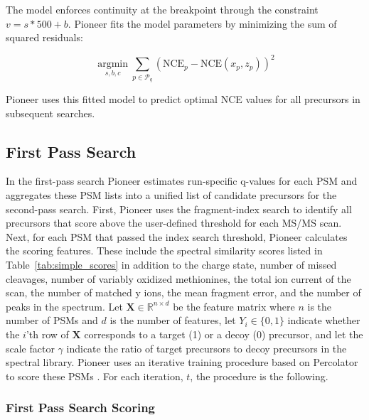 \documentclass[pdflatex,sn-nature]{sn-jnl}
\begin{document}
The model enforces continuity at the breakpoint through the constraint $v = s*500 + b$. Pioneer fits the model parameters by minimizing the sum of squared residuals:

\begin{equation}
    \underset{s,b,c}{\operatorname{argmin}} \sum_{p \in \mathcal{P}_q} (\text{NCE}_p - \text{NCE}(x_p,z_p))^2
\end{equation}

Pioneer uses this fitted model to predict optimal NCE values for all precursors in subsequent searches.

\subsection{First Pass Search}\label{subsec5}

In the first-pass search Pioneer estimates run-specific q-values for each PSM and aggregates these PSM lists into a unified list of candidate precursors for the second-pass search. First, Pioneer uses the fragment-index search to identify all precursors that score above the user-defined threshold for each MS/MS scan. Next, for each PSM that passed the index search threshold, Pioneer calculates the scoring features. These include the spectral similarity scores listed in Table~\ref{tab:simple_scores} in addition to the charge state, number of missed cleavages, number of variably oxidized methionines, the total ion current of the scan, the number of matched y ions, the mean fragment error, and the number of peaks in the spectrum. Let $\mathbf{X} \in \mathbb{R}^{n \times d}$ be the feature matrix where $n$ is the number of PSMs and $d$ is the number of features, let $Y_i \in \{0,1\}$ indicate whether the $i$'th row of $\mathbf{X}$ corresponds to a target (1) or a decoy (0) precursor, and let the scale factor $\gamma$ indicate the ratio of target precursors to decoy precursors in the spectral library. Pioneer uses an iterative training procedure based on Percolator to score these PSMs \cite{Kall2007-sy}. For each iteration, $t$, the procedure is the following.

\subsubsection{First Pass Search Scoring}
\end{document}
